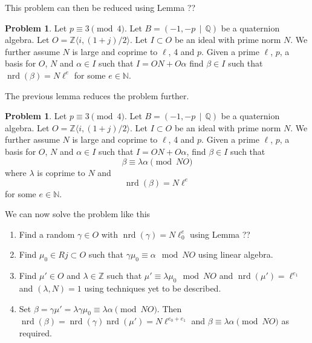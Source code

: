 \documentclass[10pt]{article}
\theoremstyle{plain}
\theoremstyle{definition}
\newtheorem{problem}[theorem]{Problem}
\newcommand{\op}{\operatorname}
\newcommand{\N}{\mathbb{N}}
\newcommand{\Z}{\mathbb{Z}}
\newcommand{\Q}{\mathbb{Q}}
\newcommand{\nrd}{\op{nrd}}
\begin{document}
This problem can then be reduced using Lemma ??

\begin{problem} \label{prob: ell power}
Let \( p \equiv 3 \pmod{4} \).
Let \( B =  (-1, -p \, \mid \, \Q) \) be a quaternion algebra.
Let \( O = \Z \langle i, (1+j) / 2 \rangle \).
Let \( I \subset O \) be an ideal with prime norm \( N \).
We further assume \( N \) is large and coprime to \( \ell \), 4 and \( p \).
Given a prime \( \ell \), \( p \), a basis for \( O \), \( N \) and \( \alpha \in I \) such that \( I = ON + O\alpha \) find \( \beta \in I \) such that \( \nrd(\beta) = N\ell^e \) for some \( e \in \N \).
\end{problem}


The previous lemma reduces the problem further.

\begin{problem} \label{prob: solve congruence}
Let \( p \equiv 3 \pmod{4} \).
Let \( B =  (-1, -p \, \mid \, \Q) \) be a quaternion algebra.
Let \( O = \Z \langle i, (1+j) / 2 \rangle \).
Let \( I \subset O \) be an ideal with prime norm \( N \).
We further assume \( N \) is large and coprime to \( \ell \), 4 and \( p \).
Given a prime \( \ell \), \( p \), a basis for \( O \), \( N \) and \( \alpha \in I \) such that \( I = ON + O\alpha \), find \( \beta \in I \) such that
\[
    \beta \equiv \lambda \alpha \pmod{NO}
\]
where \(\lambda \) is coprime to \( N \) and
\[
    \nrd(\beta) = N\ell^e
\]
for some \( e \in \N \).
\end{problem}

We can now solve the problem like this
\begin{enumerate}
    \item
          Find a random \( \gamma \in O \) with \( \nrd(\gamma) = N \ell^e_0 \) using Lemma ??
    \item
          Find \( \mu_0 \in Rj \subset  O \) such that \( \gamma\mu_0 \equiv \alpha \mod NO \) using linear algebra.
    \item
          Find \( \mu' \in  O \) and \( \lambda \in \Z \) such that \( \mu' \equiv \lambda \mu_0 \mod NO \) and \( \nrd(\mu') = \ell^{e_1} \) and \( (\lambda, N) = 1 \) using techniques yet to be described.
    \item
          Set \( \beta = \gamma \mu' = \lambda\gamma\mu_0 \equiv \lambda \alpha \pmod{NO} \). Then \( \nrd(\beta) = \nrd(\gamma)\nrd(\mu') = N\ell^{e_0 + e_1}\) and \( \beta \equiv \lambda \alpha \pmod{NO} \) as required.
\end{enumerate}
\end{document}
